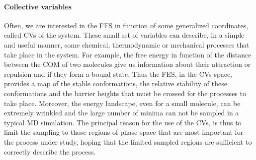 \paragraph{\textbf{Collective variables}} Often, we are interested in the \ac{FES} in function of some 
generalized coordinates, called \acp{CV} of the system. These small set of variables can describe, in a simple 
and useful manner, some chemical, thermodynamic or mechanical processes that take place in the system. For 
example, the free energy in function of the distance between the \ac{COM} of two molecules give us information 
about their attraction or repulsion and if they form a bound state. Thus the \ac{FES}, in the \acp{CV} space, 
provides a map of the stable conformations, the relative stability of these conformations and the barrier heights 
that must be crossed for the processes to take place. Moreover, the energy landscape, even for a small molecule, 
can be extremely wrinkled and the large number of minima can not be sampled in a typical \ac{MD} simulation. The 
principal reason for the use of the \acp{CV}, is thus to limit the sampling to those regions of phase space that 
are most important for the process under study, hoping that the limited sampled regions are sufficient to 
correctly describe the process.

